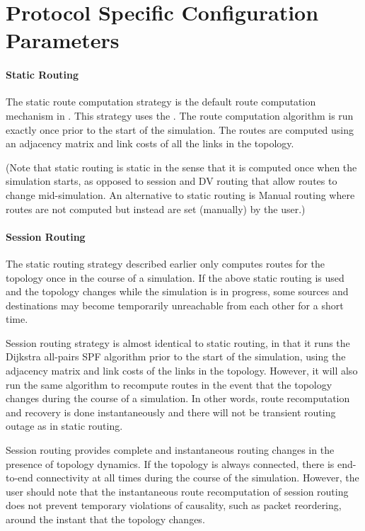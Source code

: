 \section{Protocol Specific Configuration Parameters}
\label{sec:uni:protconfig}

\paragraph{Static Routing}
The static route computation strategy is
the default route computation mechanism  in \ns.
This strategy uses the
.
The route computation algorithm is run exactly once
prior to the start of the simulation.
The routes are computed
using an adjacency matrix and link costs of all the links in the topology.

(Note that static routing is static in the sense that it is computed
  once when the simulation starts, as opposed to session
  and DV routing that allow routes to change mid-simulation.
An alternative to static routing is Manual routing
  where routes are not computed but instead are set (manually) by the user.)

\paragraph{Session Routing}
The static routing strategy described earlier
only computes routes for the topology once in the course of a simulation.
If the above static routing is used and the topology changes while the
simulation is in progress, some sources and destinations may become
temporarily unreachable from each other for a short time.

Session routing strategy is almost identical to static routing,
in that it runs the Dijkstra all-pairs SPF algorithm
prior to the start of the simulation, using the
adjacency matrix and link costs of the links in the topology.
However, it will also run the same algorithm to recompute routes
in the event that the topology changes during the course of a
simulation. 
In other words, route recomputation and recovery is done
instantaneously and there will not be transient routing outage as in
static routing. 

Session routing provides complete and instantaneous routing changes 
in the presence of topology dynamics.
If the topology is always connected, there is
end-to-end connectivity at all times during the course of the simulation.
However, the user should note that the instantaneous route recomputation 
of session routing does not prevent temporary violations of causality,
such as packet reordering, around the instant that the topology
changes. 

